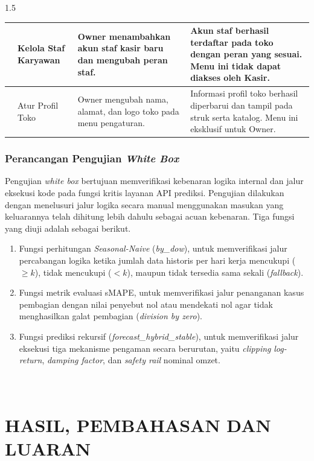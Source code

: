 \documentclass[12pt, a4paper, onecolumn, oneside]{report}
\begin{document}
\begin{spacing}{1.5}
{\begin{longtable}{|>{\centering\arraybackslash}p{0.6cm}|>{\raggedright\arraybackslash}p{3.0cm}|>{\raggedright\arraybackslash}p{4.7cm}|>{\raggedright\arraybackslash}p{4.7cm}|}
\hline
11 & Kelola Staf Karyawan & Owner menambahkan akun staf kasir baru dan mengubah peran staf. & Akun staf berhasil terdaftar pada toko dengan peran yang sesuai. Menu ini tidak dapat diakses oleh Kasir. \\
\hline
12 & Atur Profil Toko & Owner mengubah nama, alamat, dan logo toko pada menu pengaturan. & Informasi profil toko berhasil diperbarui dan tampil pada struk serta katalog. Menu ini eksklusif untuk Owner. \\
\hline
\end{longtable}
}

\subsection{Perancangan Pengujian \textit{White Box}}

Pengujian \textit{white box} bertujuan memverifikasi kebenaran logika internal dan jalur eksekusi kode pada fungsi kritis layanan API prediksi. Pengujian dilakukan dengan menelusuri jalur logika secara manual menggunakan masukan yang keluarannya telah dihitung lebih dahulu sebagai acuan kebenaran. Tiga fungsi yang diuji adalah sebagai berikut.
\begin{enumerate}
    \item Fungsi perhitungan \textit{Seasonal-Naive} (\textit{by\_dow}), untuk memverifikasi jalur percabangan logika ketika jumlah data historis per hari kerja mencukupi ($\geq k$), tidak mencukupi ($<k$), maupun tidak tersedia sama sekali (\textit{fallback}).
    \item Fungsi metrik evaluasi sMAPE, untuk memverifikasi jalur penanganan kasus pembagian dengan nilai penyebut nol atau mendekati nol agar tidak menghasilkan galat pembagian (\textit{division by zero}).
    \item Fungsi prediksi rekursif (\textit{forecast\_hybrid\_stable}), untuk memverifikasi jalur eksekusi tiga mekanisme pengaman secara berurutan, yaitu \textit{clipping} \textit{log-return}, \textit{damping factor}, dan \textit{safety rail} nominal omzet.
\end{enumerate}

\chapter[HASIL, PEMBAHASAN DAN LUARAN]{\\ HASIL, PEMBAHASAN DAN LUARAN}


\end{spacing}
\end{document}
